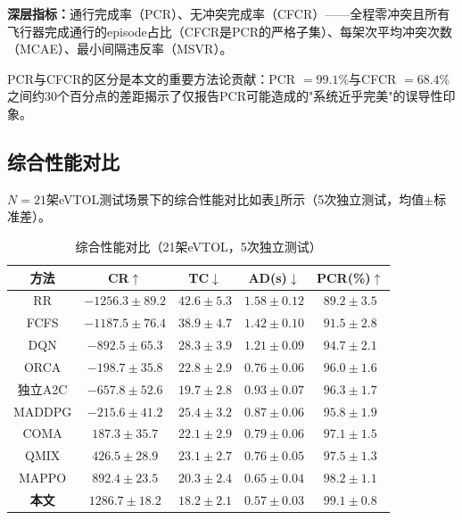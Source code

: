 \documentclass[12pt,a4paper,UTF8]{ctexart}
\begin{document}
\textbf{深层指标：}通行完成率（PCR）、无冲突完成率（CFCR）——全程零冲突且所有飞行器完成通行的episode占比（CFCR是PCR的严格子集）、每架次平均冲突次数（MCAE）、最小间隔违反率（MSVR）。

PCR与CFCR的区分是本文的重要方法论贡献：PCR $=99.1\%$与CFCR $=68.4\%$之间约30个百分点的差距揭示了仅报告PCR可能造成的"系统近乎完美"的误导性印象。

\subsection{综合性能对比}

$N=21$架eVTOL测试场景下的综合性能对比如表\ref{tab:comparison}所示（5次独立测试，均值$\pm$标准差）。

\begin{table}[H]
    \centering
    \caption{综合性能对比（21架eVTOL，5次独立测试）}
    \label{tab:comparison}
    \begin{tabular}{|c|c|c|c|c|}
        \hline
        \textbf{方法} & \textbf{CR$\uparrow$} & \textbf{TC$\downarrow$} & \textbf{AD(s)$\downarrow$} & \textbf{PCR(\%)$\uparrow$} \\
        \hline
        RR & $-1256.3\pm89.2$ & $42.6\pm5.3$ & $1.58\pm0.12$ & $89.2\pm3.5$ \\
        FCFS & $-1187.5\pm76.4$ & $38.9\pm4.7$ & $1.42\pm0.10$ & $91.5\pm2.8$ \\
        DQN & $-892.5\pm65.3$ & $28.3\pm3.9$ & $1.21\pm0.09$ & $94.7\pm2.1$ \\
        ORCA & $-198.7\pm35.8$ & $22.8\pm2.9$ & $0.76\pm0.06$ & $96.0\pm1.6$ \\
        独立A2C & $-657.8\pm52.6$ & $19.7\pm2.8$ & $0.93\pm0.07$ & $96.3\pm1.7$ \\
        MADDPG & $-215.6\pm41.2$ & $25.4\pm3.2$ & $0.87\pm0.06$ & $95.8\pm1.9$ \\
        COMA & $187.3\pm35.7$ & $22.1\pm2.9$ & $0.79\pm0.06$ & $97.1\pm1.5$ \\
        QMIX & $426.5\pm28.9$ & $23.1\pm2.7$ & $0.76\pm0.05$ & $97.5\pm1.3$ \\
        MAPPO & $892.4\pm23.5$ & $20.3\pm2.4$ & $0.65\pm0.04$ & $98.2\pm1.1$ \\
        \textbf{本文} & $\mathbf{1286.7\pm18.2}$ & $\mathbf{18.2\pm2.1}$ & $\mathbf{0.57\pm0.03}$ & $\mathbf{99.1\pm0.8}$ \\
        \hline
    \end{tabular}
\end{table}
\end{document}
